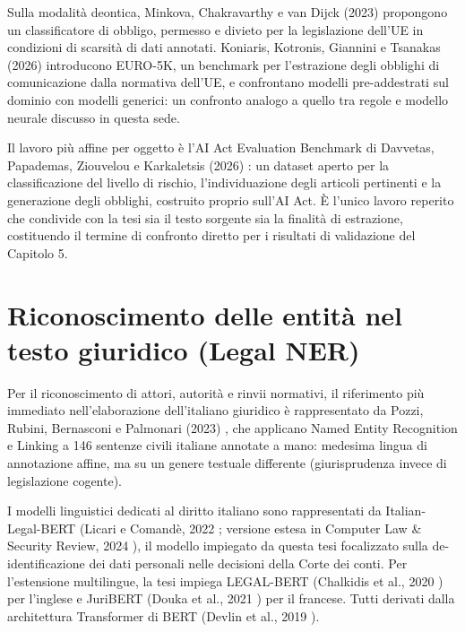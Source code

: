 \documentclass[12pt,a4paper,oneside]{report}
\begin{document}
Sulla modalità deontica, Minkova, Chakravarthy e van Dijck (2023) \cite{minkova2023deontic} propongono un classificatore di obbligo, permesso e divieto per la legislazione dell'UE in condizioni di scarsità di dati annotati. Koniaris, Kotronis, Giannini e Tsanakas (2026) \cite{koniaris2026euro5k} introducono EURO-5K, un benchmark per l'estrazione degli obblighi di comunicazione dalla normativa dell'UE, e confrontano modelli pre-addestrati sul dominio con modelli generici: un confronto analogo a quello tra regole e modello neurale discusso in questa sede.

Il lavoro più affine per oggetto è l'AI Act Evaluation Benchmark di Davvetas, Papademas, Ziouvelou e Karkaletsis (2026) \cite{davvetas2026aiact}: un dataset aperto per la classificazione del livello di rischio, l'individuazione degli articoli pertinenti e la generazione degli obblighi, costruito proprio sull'AI Act. È l'unico lavoro reperito che condivide con la tesi sia il testo sorgente sia la finalità di estrazione, costituendo il termine di confronto diretto per i risultati di validazione del Capitolo 5.

\section{Riconoscimento delle entità nel testo giuridico (Legal NER)}
Per il riconoscimento di attori, autorità e rinvii normativi, il riferimento più immediato nell'elaborazione dell'italiano giuridico è rappresentato da Pozzi, Rubini, Bernasconi e Palmonari (2023) \cite{pozzi2023nerl}, che applicano Named Entity Recognition e Linking a 146 sentenze civili italiane annotate a mano: medesima lingua di annotazione affine, ma su un genere testuale differente (giurisprudenza invece di legislazione cogente).

I modelli linguistici dedicati al diritto italiano sono rappresentati da Italian-Legal-BERT (Licari e Comandè, 2022 \cite{licari2022italianlegalbert}; versione estesa in Computer Law \& Security Review, 2024 \cite{licari2024italianlegalbert}), il modello impiegato da questa tesi focalizzato sulla de-identificazione dei dati personali nelle decisioni della Corte dei conti. Per l'estensione multilingue, la tesi impiega LEGAL-BERT (Chalkidis et al., 2020 \cite{chalkidis2020legalbert}) per l'inglese e JuriBERT (Douka et al., 2021 \cite{douka2021juribert}) per il francese. Tutti derivati dalla architettura Transformer di BERT (Devlin et al., 2019 \cite{devlin2019bert}).
\end{document}
